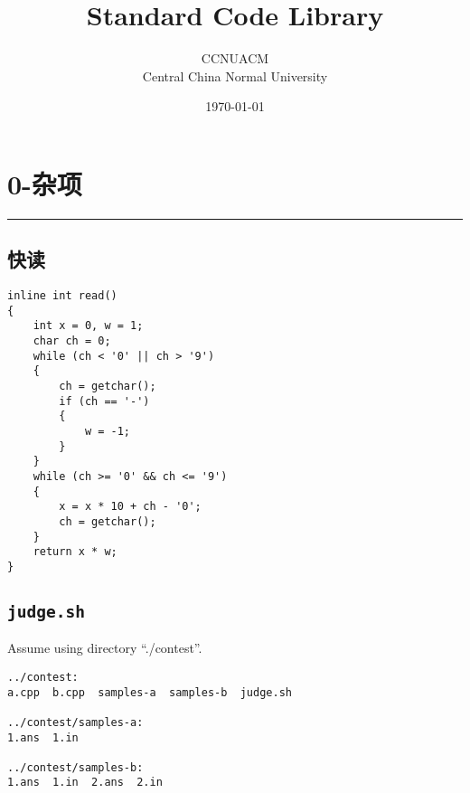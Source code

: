 \documentclass[]{article}
\date{}
\title{\vspace{50mm} \huge Standard Code Library \\[20pt]}
\author{CCNUACM \\[10pt] Central China Normal University}
\date{\today}
\begin{document}
\begin{titlepage}

\maketitle

\end{titlepage}

\newpage

\renewcommand\labelitemi{$\bullet$}

{
\setcounter{tocdepth}{3}
\tableofcontents
\newpage
}








\hypertarget{ux6742ux9879}{%
\section{0-杂项}\label{ux6742ux9879}}

\begin{center}\rule{0.5\linewidth}{0.5pt}\end{center}

\hypertarget{ux5febux8bfb}{%
\subsection{快读}\label{ux5febux8bfb}}

\begin{verbatim}
inline int read()
{
    int x = 0, w = 1;
    char ch = 0;
    while (ch < '0' || ch > '9')
    {
        ch = getchar();
        if (ch == '-')
        {
            w = -1;
        }
    }
    while (ch >= '0' && ch <= '9')
    {
        x = x * 10 + ch - '0';
        ch = getchar();
    }
    return x * w;
}
\end{verbatim}

\hypertarget{judge.sh}{%
\subsection{\texorpdfstring{\texttt{judge.sh}}{judge.sh}}\label{judge.sh}}

Assume using directory ``./contest''.

\begin{verbatim}
../contest:
a.cpp  b.cpp  samples-a  samples-b  judge.sh

../contest/samples-a:
1.ans  1.in

../contest/samples-b:
1.ans  1.in  2.ans  2.in
\end{verbatim}
\end{document}
